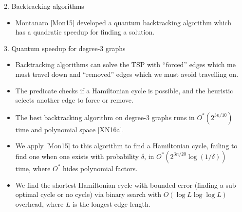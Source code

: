 \documentclass[]{templates/poster}
\begin{document}
\begin{frame}{}
\begin{columns}[t]
\begin{column}{0.422\linewidth}
\begin{block}{\Large 2. Backtracking algorithms}
\begin{itemize}
  \item Montanaro [Mon15] developed a quantum backtracking algorithm which has a quadratic speedup for finding a solution.
  \end{itemize}
  \end{block}

  \begin{block}{\Large 3. Quantum speedup for degree-3 graphs}
  \begin{itemize}
  \item Backtracking algorithms can solve the TSP with ``forced'' edges which me must travel down and ``removed'' edges which we must avoid travelling on.
  
  \item The predicate checks if a Hamiltonian cycle is possible, and the heuristic selects another edge to force or remove.

  \item The best backtracking algorithm on degree-3 graphs runs in {\color{uobred} $O^*(2^{3n/10})$} time and polynomial space [XN16a].
  
  \item We apply [Mon15] to this algorithm to find a Hamiltonian cycle, failing to find one when one exists with probability $\delta$, in {\color{uobred}$O^*(2^{3n/20}\log(1/\delta))$} time, where $O^*$ hides polynomial factors.
  
  \item We find the shortest Hamiltonian cycle with bounded error (finding a sub-optimal cycle or no cycle) via binary search with {\color{uobred}$O(\log L\log\log L)$} overhead, where $L$ is the longest edge length.
  \end{itemize}
  \end{block}
  \end{column}

  \begin{column}{0.422\linewidth}
  

\end{column}
\end{columns}
\end{frame}
\end{document}
